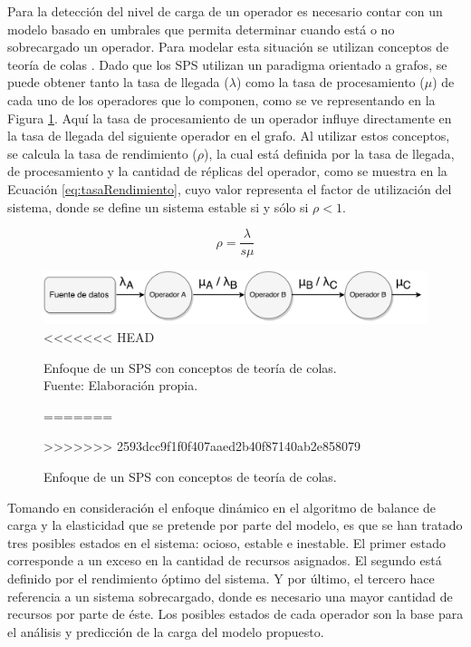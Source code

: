 Para la detecci\'on del nivel de carga de un operador es necesario contar con un modelo basado en umbrales que permita determinar cuando est\'a o no sobrecargado un operador. Para modelar esta situaci\'on se utilizan conceptos de teor\'ia de colas \citep{bose2013introduction}. Dado que los SPS utilizan un paradigma orientado a grafos, se puede obtener tanto la tasa de llegada ($\lambda$) como la tasa de procesamiento ($\mu$) de cada uno de los operadores que lo componen, como se ve representando en la Figura \ref{fig:analisisTeoriaColas}. Aqu\'i la tasa de procesamiento de un operador influye directamente en la tasa de llegada del siguiente operador en el grafo. Al utilizar estos conceptos, se calcula la tasa de rendimiento ($\rho$), la cual est\'a definida por la tasa de llegada, de procesamiento y la cantidad de r\'eplicas del operador, como se muestra en la Ecuaci\'on \ref{eq:tasaRendimiento}, cuyo valor representa el factor de utilizaci\'on del sistema, donde se define un sistema estable si y s\'olo si $\rho < 1$.

\begin{equation} \label{eq:tasaRendimiento}
	\rho = \frac{\lambda}{s \mu}
\end{equation}

\begin{figure}[!ht]
	\centering
		\includegraphics[scale=0.6]{images/AnalisisTeoriaColas.pdf}
<<<<<<< HEAD
	\caption[Enfoque de un SPS con conceptos de teoría de colas.]{Enfoque de un SPS con conceptos de teoría de colas.\\Fuente: Elaboración propia.}
=======
	\caption{Enfoque de un SPS con conceptos de teor\'ia de colas.}
>>>>>>> 2593dcc9f1f0f407aaed2b40f87140ab2e858079
	\label{fig:analisisTeoriaColas}
\end{figure}

Tomando en consideraci\'on el enfoque din\'amico en el algoritmo de balance de carga y la elasticidad que se pretende por parte del modelo, es que se han tratado tres posibles estados en el sistema: ocioso, estable e inestable. El primer estado corresponde a un exceso en la cantidad de recursos asignados. El segundo est\'a definido por el rendimiento \'optimo del sistema. Y por \'ultimo, el tercero hace referencia a un sistema sobrecargado, donde es necesario una mayor cantidad de recursos por parte de \'este. Los posibles estados de cada operador son la base para el an\'alisis y predicci\'on de la carga del modelo propuesto.

